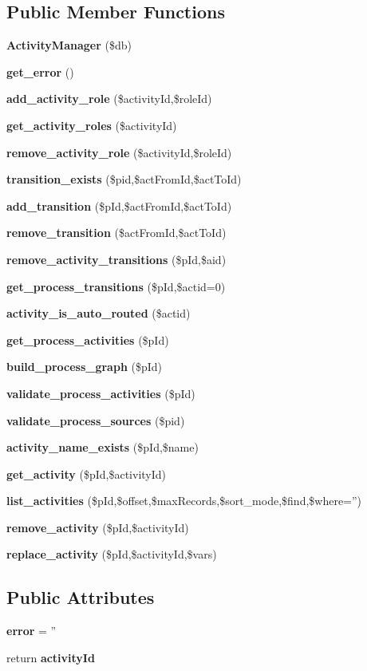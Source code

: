 \subsection*{Public Member Functions}
\begin{CompactItemize}
\item 
{\bf Activity\-Manager} (\$db)
\item 
{}
{\bf get\_\-error} ()\label{classActivityManager_a1}

\item 
{\bf add\_\-activity\_\-role} (\$activity\-Id,\$role\-Id)
\item 
{\bf get\_\-activity\_\-roles} (\$activity\-Id)
\item 
{\bf remove\_\-activity\_\-role} (\$activity\-Id,\$role\-Id)
\item 
{\bf transition\_\-exists} (\$pid,\$act\-From\-Id,\$act\-To\-Id)
\item 
{\bf add\_\-transition} (\$p\-Id,\$act\-From\-Id,\$act\-To\-Id)
\item 
{\bf remove\_\-transition} (\$act\-From\-Id,\$act\-To\-Id)
\item 
{\bf remove\_\-activity\_\-transitions} (\$p\-Id,\$aid)
\item 
{\bf get\_\-process\_\-transitions} (\$p\-Id,\$actid=0)
\item 
{\bf activity\_\-is\_\-auto\_\-routed} (\$actid)
\item 
{\bf get\_\-process\_\-activities} (\$p\-Id)
\item 
{\bf build\_\-process\_\-graph} (\$p\-Id)
\item 
{\bf validate\_\-process\_\-activities} (\$p\-Id)
\item 
{\bf validate\_\-process\_\-sources} (\$pid)
\item 
{\bf activity\_\-name\_\-exists} (\$p\-Id,\$name)
\item 
{\bf get\_\-activity} (\$p\-Id,\$activity\-Id)
\item 
{\bf list\_\-activities} (\$p\-Id,\$offset,\$max\-Records,\$sort\_\-mode,\$find,\$where='')
\item 
{\bf remove\_\-activity} (\$p\-Id,\$activity\-Id)
\item 
{\bf replace\_\-activity} (\$p\-Id,\$activity\-Id,\$vars)
\end{CompactItemize}
\subsection*{Public Attributes}
\begin{CompactItemize}
\item 
{}
{\bf error} = ''\label{classActivityManager_m0}

\item 
{}
return {\bf activity\-Id}\label{classActivityManager_m1}

\end{CompactItemize}


